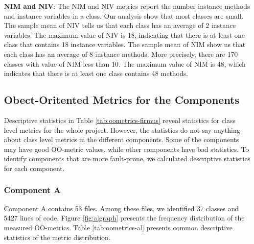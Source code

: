 \textbf{NIM and NIV}: The NIM and NIV metrics report the number instance methods and instance variables in a class. Our analysis show that most classes are small. The sample mean of NIV tells us that each class has an average of 2 instance variables. The maximum value of NIV is 18, indicating that there is at least one class that contains 18 instance variables. The sample mean of NIM show us that each class has an average of 8 instance methods. More precisely, there are 170 classes with value of NIM less than 10. The maximum value of NIM is 48, which indicates that there is at least one class contains 48 methods. 





\subsection{Obect-Oritented Metrics for the Components}
\label{subsec:oometric-comp}
Descriptive statistics in Table \ref{tab:oometrics-firmus} reveal statistics for class level metrics for the whole project. However, the statistics do not say anything about class level metrics in the different components. Some of the components may have good OO-metric values, while other components have bad statistics. To identify components that are more fault-prone, we calculated descriptive statistics for each component.

\subsubsection{Component A}
Component A contains 53 files. Among these files, we identified 37 classes and 5427 lines of code. Figure \ref{fig:algraph} presents the frequency distribution of the measured OO-metrics. Table \ref{tab:oometrics-al} presents common descriptive statistics of the metric distribution.

